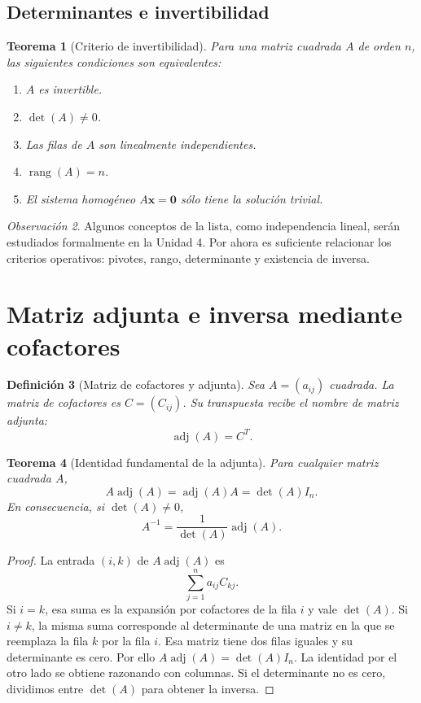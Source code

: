 \documentclass[12pt]{article}
\newtheorem{definicion}{Definición}[section]
\newtheorem{teorema}[definicion]{Teorema}
\theoremstyle{remark}
\newtheorem{observacion}[definicion]{Observación}
\newcommand{\rang}{\operatorname{rang}}
\newcommand{\adj}{\operatorname{adj}}
\newcommand{\vect}[1]{\boldsymbol{#1}}
\begin{document}
\subsection{Determinantes e invertibilidad}
\begin{teorema}[Criterio de invertibilidad]
Para una matriz cuadrada $A$ de orden $n$, las siguientes condiciones son equivalentes:
\begin{enumerate}
\item $A$ es invertible.
\item $\det(A)\ne0$.
\item Las filas de $A$ son linealmente independientes.
\item $\rang(A)=n$.
\item El sistema homogéneo $A\vect{x}=\vect{0}$ sólo tiene la solución trivial.
\end{enumerate}
\end{teorema}
\begin{observacion}
Algunos conceptos de la lista, como independencia lineal, serán estudiados formalmente en la Unidad 4. Por ahora es suficiente relacionar los criterios operativos: pivotes, rango, determinante y existencia de inversa.
\end{observacion}

\section{Matriz adjunta e inversa mediante cofactores}
\begin{definicion}[Matriz de cofactores y adjunta]
Sea $A=(a_{ij})$ cuadrada. La \emph{matriz de cofactores} es $C=(C_{ij})$. Su transpuesta recibe el nombre de \emph{matriz adjunta}:
\[
\boxed{\adj(A)=C^T.}
\]
\end{definicion}

\begin{teorema}[Identidad fundamental de la adjunta]
Para cualquier matriz cuadrada $A$,
\[
A\adj(A)=\adj(A)A=\det(A)I_n.
\]
En consecuencia, si $\det(A)\ne0$,
\[
\boxed{A^{-1}=\frac{1}{\det(A)}\adj(A).}
\]
\end{teorema}
\begin{proof}
La entrada $(i,k)$ de $A\adj(A)$ es
\[
\sum_{j=1}^{n}a_{ij}C_{kj}.
\]
Si $i=k$, esa suma es la expansión por cofactores de la fila $i$ y vale $\det(A)$. Si $i\ne k$, la misma suma corresponde al determinante de una matriz en la que se reemplaza la fila $k$ por la fila $i$. Esa matriz tiene dos filas iguales y su determinante es cero. Por ello $A\adj(A)=\det(A)I_n$. La identidad por el otro lado se obtiene razonando con columnas. Si el determinante no es cero, dividimos entre $\det(A)$ para obtener la inversa.
\end{proof}
\end{document}
